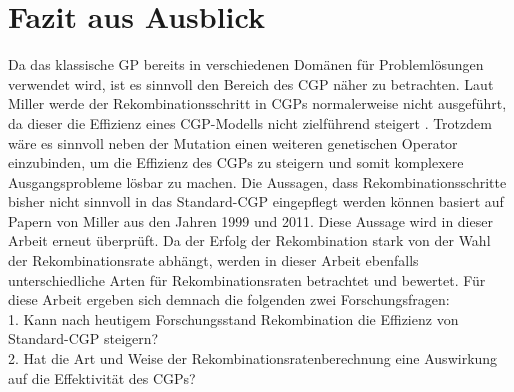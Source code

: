 \chapter{Fazit aus Ausblick}
\label{Fazit}

Da das klassische GP bereits in verschiedenen Domänen für Problemlösungen verwendet wird, ist es sinnvoll den Bereich des CGP näher zu betrachten.
Laut Miller werde der Rekombinationsschritt in CGPs normalerweise nicht ausgeführt, da dieser die Effizienz eines CGP-Modells nicht zielführend steigert \cite{miller_cartesian_2020}.
Trotzdem wäre es sinnvoll neben der Mutation einen weiteren genetischen Operator einzubinden, um die Effizienz des CGPs zu steigern und somit komplexere Ausgangsprobleme lösbar zu machen.
Die Aussagen, dass Rekombinationsschritte bisher nicht sinnvoll in das Standard-CGP eingepflegt werden können basiert auf Papern von Miller aus den Jahren 1999 und 2011.
Diese Aussage wird in dieser Arbeit erneut überprüft.
Da der Erfolg der Rekombination stark von der Wahl der Rekombinationsrate abhängt, werden in dieser Arbeit ebenfalls unterschiedliche Arten für Rekombinationsraten betrachtet und bewertet.
Für diese Arbeit ergeben sich demnach die folgenden zwei Forschungsfragen:\\
1. Kann nach heutigem Forschungsstand Rekombination die Effizienz von Standard-CGP steigern?\\
2. Hat die Art und Weise der Rekombinationsratenberechnung eine Auswirkung auf die Effektivität des CGPs?

